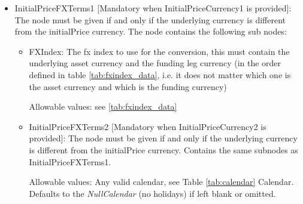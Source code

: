 \begin{itemize}
\item InitialPriceFXTerms1 [Mandatory when InitialPriceCurrency1 is provided]: The node must be given if and only if the underlying currency is different from the initialPrice currency. The node contains the following sub nodes:
\begin{itemize}
  \item FXIndex: The fx index to use for the conversion, this must contain the underlying asset currency and the funding leg
    currency (in the order defined in table \ref{tab:fxindex_data}, i.e. it does not matter which one is the asset currency and which is the funding currency)
    
    Allowable values: see \ref{tab:fxindex_data}
	
\item InitialPriceFXTerms2 [Mandatory when InitialPriceCurrency2 is provided]: The node must be given if and only if the underlying currency is different from the initialPrice currency. Contains the same subnodes as InitialPriceFXTerms1.

    Allowable values: Any valid calendar, see Table \ref{tab:calendar} Calendar. Defaults to the \emph{NullCalendar} (no holidays) if left blank or omitted.
\end{itemize}
\end{itemize}

